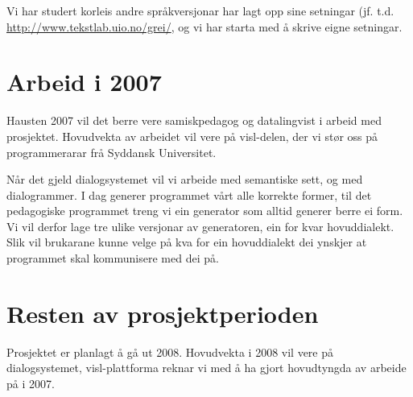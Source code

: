 \documentclass[a4paper,norsk]{article}
\begin{document}
Vi har studert korleis andre språkversjonar har lagt opp sine setningar (jf. t.d. \url{http://www.tekstlab.uio.no/grei/}, og vi har starta med å skrive eigne setningar.

\section{Arbeid i 2007}

Hausten 2007 vil det berre vere samiskpedagog og datalingvist i arbeid med prosjektet. Hovudvekta av arbeidet vil vere på visl-delen, der vi stør oss på programmerarar frå Syddansk Universitet.

Når det gjeld dialogsystemet vil vi arbeide med semantiske sett, og med dialogrammer. I dag generer programmet vårt alle korrekte former, til det pedagogiske programmet treng vi ein generator som alltid generer berre ei form. Vi vil derfor lage tre ulike versjonar av generatoren, ein for kvar hovuddialekt. Slik vil brukarane kunne velge på kva for ein hovuddialekt dei ynskjer at programmet skal kommunisere med dei på.

\section{Resten av prosjektperioden}

Prosjektet er planlagt å gå ut 2008. Hovudvekta i 2008 vil vere på dialogsystemet, visl-plattforma reknar vi med å ha gjort hovudtyngda av arbeide på i 2007. 
\end{document}
